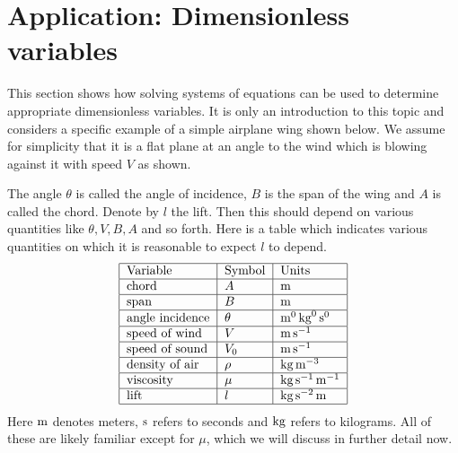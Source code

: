 \section{Application: Dimensionless variables}

This section shows how solving systems of equations can be used to
determine appropriate dimensionless variables. It is only an
introduction to this topic and considers a specific example of a
simple airplane wing shown below. We assume for simplicity that it is
a flat plane at an angle to the wind which is blowing against it with
speed $V$ as shown.

\begin{center}
\end{center}

The angle $\theta$ is called the angle of incidence, $B$ is the span
of the wing and $A$ is called the chord. Denote by $l$ the lift. Then
this should depend on various quantities like $\theta,V,B,A$ and so
forth. Here is a table which indicates various quantities on which it
is reasonable to expect $l$ to depend.
\begin{equation*}
  \begin{tabular}{|l|l|l|}
    \hline
    Variable & Symbol & Units \\ \hline
    chord & $A$ & $\m$ \\ \hline
    span & $B$ & $\m$ \\ \hline
    angle incidence & $\theta$ & $\m^0\kg^0\s^0$ \\ \hline
    speed of wind & $V$ & $\m\s^{-1}$ \\ \hline
    speed of sound & $V_0$ & $\m\s^{-1}$ \\ \hline
    density of air & $\rho$ & $\kg\m^{-3}$ \\ \hline
    viscosity & $\mu$ & $\kg\s^{-1}\m^{-1}$ \\ \hline
    lift & $l$ & $\kg\s^{-2}\m$ \\ \hline
  \end{tabular}
\end{equation*}
Here $\mathop{\textrm{\rm m}}\nolimits$ denotes meters, $\mathop{\textrm{\rm s}}\nolimits$ refers to seconds and $\mathop{\textrm{\rm kg}}\nolimits$ refers to
kilograms. All of these are likely familiar except for $\mu$, which we
will discuss in further detail now.

